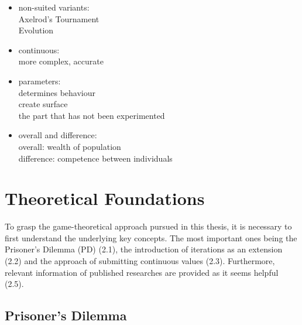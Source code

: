 \documentclass{article}
\begin{document}
\begin{itemize}
	\item non-suited variants:\\
		Axelrod's Tournament\\
		Evolution\\

	\item continuous:\\
		more complex, accurate\\

	\item parameters:\\
		determines behaviour\\
		create surface\\
		the part that has not been experimented\\

	\item overall and difference:\\
		overall: wealth of population\\
		difference: competence between individuals\\

\end{itemize}

\section{Theoretical Foundations}

To grasp the game-theoretical approach pursued in this thesis, it is necessary to first understand the underlying key concepts. 
The most important ones being the Prisoner's Dilemma (PD) (2.1), the introduction of iterations as an extension (2.2) and the approach of submitting continuous values (2.3).
Furthermore, relevant information of published researches are provided as it seems helpful (2.5).

\subsection{Prisoner's Dilemma}
		
\end{document}
